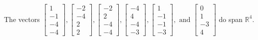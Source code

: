 \begin{exercise}
\begin{exerciseStatement}
  \end{exerciseStatement}
  \begin{exerciseAnswer}
   The vectors \(\left[\begin{array}{r}
1 \\
-1 \\
-4 \\
-4
\end{array}\right] , \left[\begin{array}{r}
-2 \\
-4 \\
2 \\
2
\end{array}\right] , \left[\begin{array}{r}
-2 \\
2 \\
-4 \\
-4
\end{array}\right] , \left[\begin{array}{r}
-4 \\
4 \\
-4 \\
-3
\end{array}\right] , \left[\begin{array}{r}
1 \\
-1 \\
-1 \\
-3
\end{array}\right] , \text{ and } \left[\begin{array}{r}
0 \\
1 \\
-3 \\
4
\end{array}\right]\) 
  	 do  
	span \(\mathbb{R}^4\).
  


  \end{exerciseAnswer}
\end{exercise}